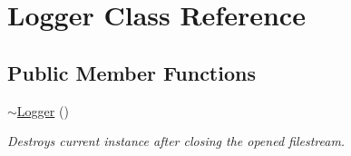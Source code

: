 \hypertarget{class_logger}{}\section{Logger Class Reference}
\label{class_logger}
\subsection*{Public Member Functions}
\begin{DoxyCompactItemize}
\item 
\mbox{\label{class_logger_acb668a9e186a25fbaad2e4af6d1ed00a}} 
\mbox{\hyperlink{class_logger_acb668a9e186a25fbaad2e4af6d1ed00a}{$\sim$\+Logger}} ()
\begin{DoxyCompactList}\small\item\em Destroys current instance after closing the opened filestream. \end{DoxyCompactList}\end{DoxyCompactItemize}
